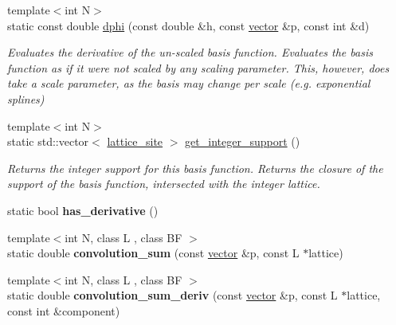 \begin{DoxyCompactItemize}
\mbox{\label{classsisl_1_1basis__function_ad4210a18404d763b781152fb41b3f173}} 
{\footnotesize template$<$int N$>$ }\\static const double \hyperlink{classsisl_1_1basis__function_ad4210a18404d763b781152fb41b3f173}{dphi} (const double \&h, const \hyperlink{namespacesisl_a2069bd5374a9be042ff3ce3306d41e1a}{vector} \&p, const int \&d)
\begin{DoxyCompactList}\small\item\em Evaluates the derivative of the un-\/scaled basis function. Evaluates the basis function as if it were not scaled by any scaling parameter. This, however, does take a scale parameter, as the basis may change per scale (e.\+g. exponential splines) \end{DoxyCompactList}\item 
\mbox{\label{classsisl_1_1basis__function_a6e8b07cacc2f6a14272992d40c19cabb}} 
{\footnotesize template$<$int N$>$ }\\static std\+::vector$<$ \hyperlink{namespacesisl_acd18feee4026583db6185df2b25434aa}{lattice\+\_\+site} $>$ \hyperlink{classsisl_1_1basis__function_a6e8b07cacc2f6a14272992d40c19cabb}{get\+\_\+integer\+\_\+support} ()
\begin{DoxyCompactList}\small\item\em Returns the integer support for this basis function. Returns the closure of the support of the basis function, intersected with the integer lattice. \end{DoxyCompactList}\item 
\mbox{\label{classsisl_1_1basis__function_a320a0e4a41913993312fa99e59605663}} 
static bool {\bfseries has\+\_\+derivative} ()
\item 
\mbox{\label{classsisl_1_1basis__function_acbd2e8d5399260b958bb781685b38983}} 
{\footnotesize template$<$int N, class L , class BF $>$ }\\static double {\bfseries convolution\+\_\+sum} (const \hyperlink{namespacesisl_a2069bd5374a9be042ff3ce3306d41e1a}{vector} \&p, const L $\ast$lattice)
\item 
\mbox{\label{classsisl_1_1basis__function_acd7a5e4de21481e6a543fa65f92c19c9}} 
{\footnotesize template$<$int N, class L , class BF $>$ }\\static double {\bfseries convolution\+\_\+sum\+\_\+deriv} (const \hyperlink{namespacesisl_a2069bd5374a9be042ff3ce3306d41e1a}{vector} \&p, const L $\ast$lattice, const int \&component)

\end{DoxyCompactItemize}
